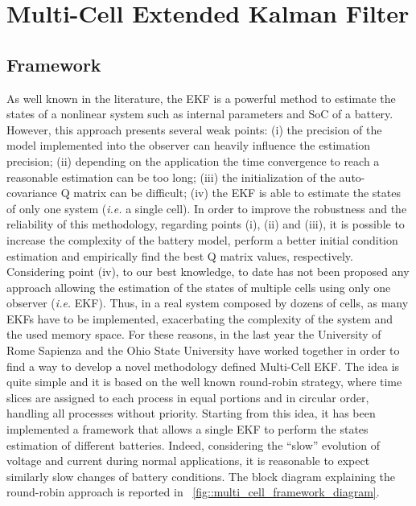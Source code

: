 \documentclass[journal]{IEEEtran}
\begin{document}
\section{Multi-Cell Extended Kalman Filter}
\label{sec::multi_cell_ekf}

\subsection{Framework}
\label{sec::multi_cell_ekf_framework}

As well known in  the literature, the EKF is a powerful method to estimate the states of a nonlinear system such as internal parameters and SoC of a battery. 
However, this approach presents several weak points:
(i) the precision of the model implemented into the observer can heavily influence the estimation precision; (ii) depending on the application the time convergence to reach a reasonable estimation can be too long; (iii) the initialization of the auto-covariance Q matrix can be difficult; (iv) the EKF is able to estimate the states of only one system (\textit{i.e.} a single cell). 
In order to improve the robustness and the reliability of this methodology, regarding points (i), (ii) and (iii), it is possible to increase the complexity of the battery model, perform a better initial condition estimation and empirically find the best Q matrix values, respectively.
Considering point (iv), to our best knowledge, to date has not been proposed any approach allowing the estimation of the states of multiple cells using only one observer (\textit{i.e.} EKF).
Thus, in a real system composed by dozens of cells, as many EKFs have to be implemented, exacerbating the complexity of the system and the used memory space.
For these reasons, in the last year the University of Rome Sapienza and the Ohio State University have worked together in order to find a way to develop a novel methodology defined Multi-Cell EKF.
The idea is quite simple and it is based on the well known round-robin strategy, where time slices are assigned to each process in equal portions and in circular order, handling all processes without priority.
Starting from this idea, it has been implemented a framework that allows a single EKF to perform the states estimation of different batteries.
Indeed, considering the ``slow'' evolution of voltage and current during normal applications, it is reasonable to expect similarly slow changes of battery conditions.
The block diagram explaining the round-robin approach is reported in \figurename~\ref{fig::multi_cell_framework_diagram}.
\end{document}
